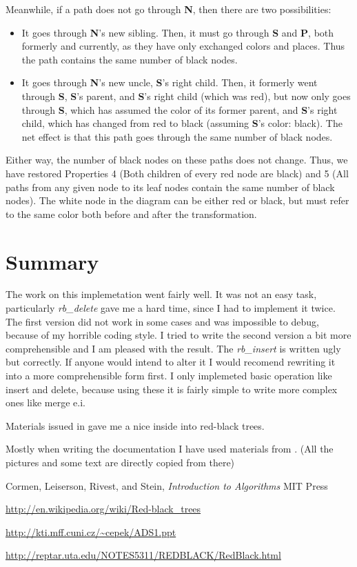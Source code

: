 \documentclass{article}
\newcommand{\inlinecode}[1]{\textit{#1}}
\begin{document}
Meanwhile, if a path does not go through \textbf{N}, then there are two possibilities:
\begin{itemize}
\item
It goes through \textbf{N}'s new sibling. Then, it must go through \textbf{S} and \textbf{P}, both formerly and currently, as they have only exchanged colors and places. Thus the path contains the same number of black nodes.
\item
It goes through \textbf{N}'s new uncle, \textbf{S}'s right child. Then, it formerly went through \textbf{S}, \textbf{S}'s parent, and \textbf{S}'s right child (which was red), but now only goes through \textbf{S}, which has assumed the color of its former parent, and \textbf{S}'s right child, which has changed from red to black (assuming \textbf{S}'s color: black). The net effect is that this path goes through the same number of black nodes.
\end{itemize}

Either way, the number of black nodes on these paths does not change. Thus, we have restored Properties 4 (Both children of every red node are black) and 5 (All paths from any given node to its leaf nodes contain the same number of black nodes). The white node in the diagram can be either red or black, but must refer to the same color both before and after the transformation.

\section{Summary}
The work on this implemetation went fairly well. It was not an easy task, particularly \inlinecode{rb\_delete} gave me a hard time, since I had to implement it twice. The first version did not work in some cases and was impossible to debug, because of my horrible coding style. I tried to write the second version a bit more comprehensible and I am pleased with the result. The \inlinecode{rb\_insert} is written ugly but correctly. If anyone would intend to alter it I would recomend rewriting it into a more comprehensible form first. I only implemeted basic operation like insert and delete, because using these it is fairly simple to write more complex ones like merge e.i.

Materials issued in \cite{cepek} gave me a nice inside into red-black trees.

Mostly when writing the documentation I have used materials from \cite{wiki}. (All the pictures and some text are directly copied from there) 


\begin{thebibliography}{9}

    Cormen, Leiserson, Rivest, and Stein, 
    \emph{Introduction to Algorithms}
	MIT Press
	
    \url{http://en.wikipedia.org/wiki/Red-black_trees}

    \url{http://kti.mff.cuni.cz/~cepek/ADS1.ppt}

    \url{http://reptar.uta.edu/NOTES5311/REDBLACK/RedBlack.html}
	
\end{thebibliography}
\end{document}
